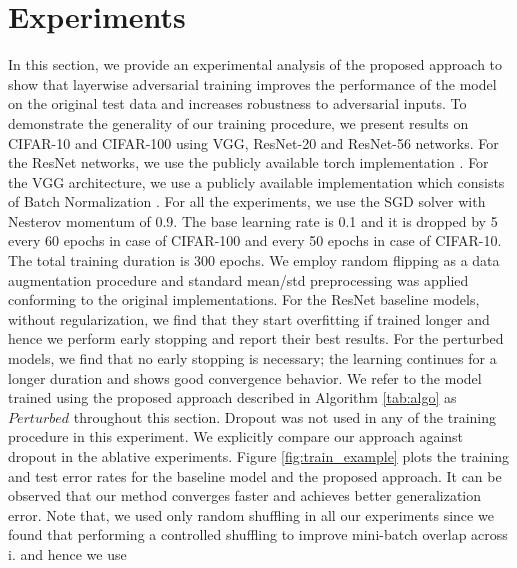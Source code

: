 \section{Experiments}
In this section, we provide an experimental analysis of the proposed approach to show that layerwise adversarial training improves the performance of the model on the original test data and increases robustness to adversarial inputs. To demonstrate the generality of our training procedure, we present results on CIFAR-10 and CIFAR-100 \cite{krizhevsky2009learning} using VGG, ResNet-20 and ResNet-56 networks. For the ResNet networks, we use the publicly available torch implementation \cite{ResNetTorch}. For the VGG architecture, we use a publicly available implementation which consists of Batch Normalization \cite{VGGTorch}. For all the experiments, we use the SGD solver with Nesterov momentum of 0.9. The base learning rate is 0.1 and it is dropped by 5 every 60 epochs in case of CIFAR-100 and every 50 epochs in case of CIFAR-10. The total training duration is 300 epochs. We employ random flipping as a data augmentation procedure and standard mean/std preprocessing was applied conforming to the original implementations. For the ResNet baseline models, without regularization, we find that they start overfitting if trained longer and hence we perform early stopping and report their best results. For the perturbed models, we find that no early stopping is necessary; the learning continues for a longer duration and shows good convergence behavior.  We refer to the model trained using the proposed approach described in Algorithm \ref{tab:algo} as $Perturbed$ throughout this section. Dropout was not used in any of the training procedure in this experiment. We explicitly compare our approach against dropout in the ablative experiments. Figure \ref{fig:train_example} plots the training and test error rates for the baseline model and the proposed approach. It can be observed that our method converges faster and achieves better generalization error. Note that, we used  only random shuffling in all our experiments since we found that performing a controlled shuffling to improve mini-batch overlap across i. and hence we use


